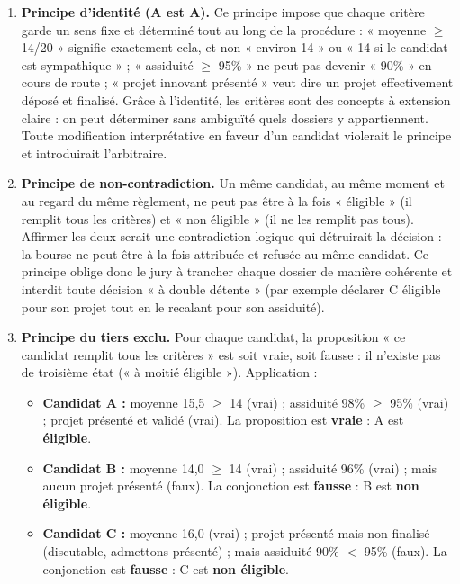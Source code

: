 \documentclass[11pt]{article}
\begin{document}
\begin{corrige}
\begin{enumerate}
    \item \textbf{Principe d'identité (A est A).} Ce principe impose que chaque critère garde un sens fixe et déterminé tout au long de la procédure : « moyenne $\ge$ 14/20 » signifie exactement cela, et non « environ 14 » ou « 14 si le candidat est sympathique » ; « assiduité $\ge$ 95\% » ne peut pas devenir « 90\% » en cours de route ; « projet innovant présenté » veut dire un projet effectivement déposé et finalisé. Grâce à l'identité, les critères sont des concepts à extension claire : on peut déterminer sans ambiguïté quels dossiers y appartiennent. Toute modification interprétative en faveur d'un candidat violerait le principe et introduirait l'arbitraire.
    \item \textbf{Principe de non-contradiction.} Un même candidat, au même moment et au regard du même règlement, ne peut pas être à la fois « éligible » (il remplit tous les critères) et « non éligible » (il ne les remplit pas tous). Affirmer les deux serait une contradiction logique qui détruirait la décision : la bourse ne peut être à la fois attribuée et refusée au même candidat. Ce principe oblige donc le jury à trancher chaque dossier de manière cohérente et interdit toute décision « à double détente » (par exemple déclarer C éligible pour son projet tout en le recalant pour son assiduité).
    \item \textbf{Principe du tiers exclu.} Pour chaque candidat, la proposition « ce candidat remplit tous les critères » est soit vraie, soit fausse : il n'existe pas de troisième état (« à moitié éligible »). Application :
    \begin{itemize}
        \item \textbf{Candidat A :} moyenne 15,5 $\ge$ 14 (vrai) ; assiduité 98\% $\ge$ 95\% (vrai) ; projet présenté et validé (vrai). La proposition est \textbf{vraie} : A est \textbf{éligible}.
        \item \textbf{Candidat B :} moyenne 14,0 $\ge$ 14 (vrai) ; assiduité 96\% (vrai) ; mais aucun projet présenté (faux). La conjonction est \textbf{fausse} : B est \textbf{non éligible}.
        \item \textbf{Candidat C :} moyenne 16,0 (vrai) ; projet présenté mais non finalisé (discutable, admettons présenté) ; mais assiduité 90\% $<$ 95\% (faux). La conjonction est \textbf{fausse} : C est \textbf{non éligible}.

\end{itemize}
\end{enumerate}
\end{corrige}
\end{document}
